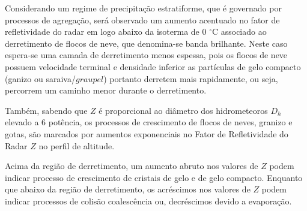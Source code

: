 Considerando um regime de precipitação estratiforme, que é governado por processos de agregação, será observado um aumento acentuado no fator de refletividade do radar em logo abaixo da isoterma de 0 $^{\circ}$C associado ao derretimento de flocos de neve, que denomina-se banda brilhante. Neste caso espera-se uma camada de derretimento menos espessa, pois os flocos de neve possuem velocidade terminal e densidade inferior as partículas de gelo compacto (ganizo ou saraiva/$graupel$) portanto derretem mais rapidamente, ou seja, percorrem um caminho menor durante o derretimento. 






Também, sabendo que $Z$ é proporcional ao diâmetro dos hidrometeoros $D_h$ elevado a 6 potência, os processos de crescimento de flocos de neves, granizo e gotas, são marcados por aumentos exponenciais no Fator de Refletividade do Radar $Z$ no perfil de altitude. 


Acima da região de derretimento, um aumento abruto nos valores de $Z$ podem indicar processo de crescimento de cristais de gelo e de gelo compacto. Enquanto que abaixo da região de derretimento, os acréscimos nos valores de $Z$ podem indicar processos de colisão coalescência ou, decréscimos devido a evaporação. 








